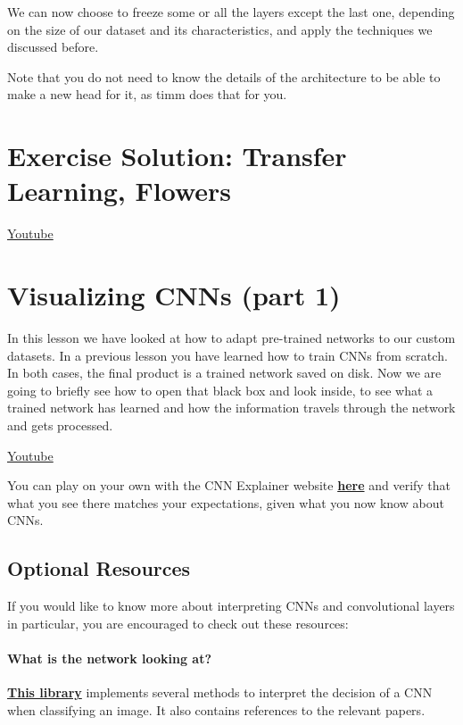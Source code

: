 We can now choose to freeze some or all the layers except the last one, depending on the size of our dataset and its characteristics, and apply the techniques we discussed before. \newline

Note that you do not need to know the details of the architecture to be able to make a new head for it, as timm does that for you.
\section{Exercise Solution: Transfer Learning, Flowers}
\href{https://www.youtube.com/watch?v=SrJ9--3lsnQ&ab_channel=Udacity}{Youtube} 

\section{Visualizing CNNs (part 1)}

In this lesson we have looked at how to adapt pre-trained networks to our custom datasets. In a previous lesson you have learned how to train CNNs from scratch. In both cases, the final product is a trained network saved on disk. Now we are going to briefly see how to open that black box and look inside, to see what a trained network has learned and how the information travels through the network and gets processed. \newline

\href{https://www.youtube.com/watch?v=IVnPArwqsFU&ab_channel=Udacity}{Youtube} \newline

You can play on your own with the CNN Explainer website \href{https://poloclub.github.io/cnn-explainer/}{\textbf{here}} and verify that what you see there matches your expectations, given what you now know about CNNs.

\subsection{Optional Resources}

If you would like to know more about interpreting CNNs and convolutional layers in particular, you are encouraged to check out these resources:

\paragraph{What is the network looking at?}

\href{https://github.com/jacobgil/pytorch-grad-cam}{\textbf{This library}} implements several methods to interpret the decision of a CNN when classifying an image. It also contains references to the relevant papers.

